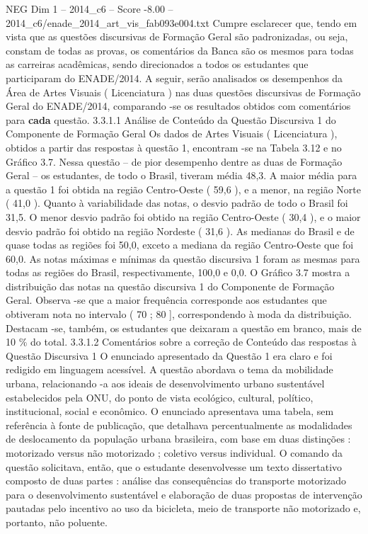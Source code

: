 \begin{textsample}{NEG Dim 1 – 2014\_c6 – Score -8.00 – 2014\_c6/enade\_2014\_art\_vis\_fab093e004.txt}
Cumpre esclarecer que, tendo em vista que as questões discursivas de Formação Geral são padronizadas, ou seja, constam de todas as provas, os comentários da Banca são os mesmos para todas as carreiras acadêmicas, sendo direcionados a todos os estudantes que participaram do ENADE/2014.
A seguir, serão analisados os desempenhos da Área de Artes Visuais ( Licenciatura ) nas duas questões discursivas de Formação Geral do ENADE/2014, comparando -se os resultados obtidos com comentários para \textbf{cada} questão. 3.3.1.1 Análise de Conteúdo da Questão Discursiva 1 do Componente de Formação Geral Os dados de Artes Visuais ( Licenciatura ), obtidos a partir das respostas à questão 1, encontram -se na Tabela 3.12 e no Gráfico 3.7.
Nessa questão – de pior desempenho dentre as duas de Formação Geral – os estudantes, de todo o Brasil, tiveram média 48,3.
A maior média para a questão 1 foi obtida na região Centro-Oeste ( 59,6 ), e a menor, na região Norte ( 41,0 ).
Quanto à variabilidade das notas, o desvio padrão de todo o Brasil foi 31,5.
O menor desvio padrão foi obtido na região Centro-Oeste ( 30,4 ), e o maior desvio padrão foi obtido na região Nordeste ( 31,6 ).
As medianas do Brasil e de quase todas as regiões foi 50,0, exceto a mediana da região Centro-Oeste que foi 60,0.
As notas máximas e mínimas da questão discursiva 1 foram as mesmas para todas as regiões do Brasil, respectivamente, 100,0 e 0,0.
O Gráfico 3.7 mostra a distribuição das notas na questão discursiva 1 do Componente de Formação Geral.
Observa -se que a maior frequência corresponde aos estudantes que obtiveram nota no intervalo ( 70 ; 80 ], correspondendo à moda da distribuição.
Destacam -se, também, os estudantes que deixaram a questão em branco, mais de 10 \% do total. 3.3.1.2 Comentários sobre a correção de Conteúdo das respostas à Questão Discursiva 1 O enunciado apresentado da Questão 1 era claro e foi redigido em linguagem acessível.
A questão abordava o tema da mobilidade urbana, relacionando -a aos ideais de desenvolvimento urbano sustentável estabelecidos pela ONU, do ponto de vista ecológico, cultural, político, institucional, social e econômico.
O enunciado apresentava uma tabela, sem referência à fonte de publicação, que detalhava percentualmente as modalidades de deslocamento da população urbana brasileira, com base em duas distinções : motorizado versus não motorizado ; coletivo versus individual.
O comando da questão solicitava, então, que o estudante desenvolvesse um texto dissertativo composto de duas partes : análise das consequências do transporte motorizado para o desenvolvimento sustentável e elaboração de duas propostas de intervenção pautadas pelo incentivo ao uso da bicicleta, meio de transporte não motorizado e, portanto, não poluente.

\end{textsample}
